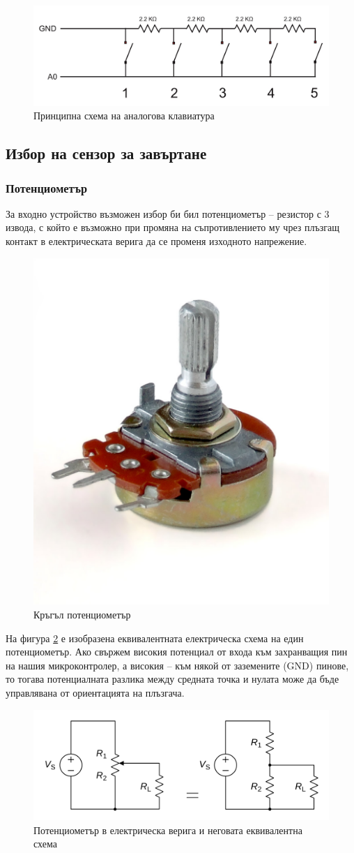 \documentclass[titlepage, oneside, 14pt]{extbook}
\begin{document}
\begin{figure}[!htbp]
    \centering
    \includegraphics[width=0.5\linewidth]{img/keypad_circuit.png}
    \caption{Принципна схема на аналогова клавиатура}
    \label{keypad_circuit}
\end{figure}

\subsection{Избор на сензор за завъртане}

\subsubsection{Потенциометър}

За входно устройство възможен избор би бил потенциометър \cite{potent} --
резистор с 3 извода, с който е възможно при промяна на съпротивлението му
чрез плъзгащ контакт в електрическата верига да се променя изходното напрежение.

\begin{figure}[!htbp]
    \centering
    \includegraphics[width=0.3\linewidth]{img/potentiometer.png}
    \caption{Кръгъл потенциометър}
\end{figure}

На фигура \ref{potentiometer_circuit} е изобразена еквивалентната електрическа схема на един потенциометър.
Ако свържем високия потенциал от входа към захранващия пин на нашия микроконтролер,
а високия -- към някой от заземените (GND) пинове, то тогава потенциалната разлика между
средната точка и нулата може да бъде управлявана от ориентацията на плъзгача.

\begin{figure}[!htbp]
    \centering
    \includegraphics[width=0.7\linewidth]{img/potentiometer_circuit.png}
    \caption{Потенциометър в електрическа верига и неговата еквивалентна схема}
    \label{potentiometer_circuit}
\end{figure}
\end{document}
